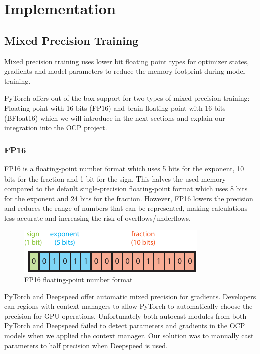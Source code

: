 \section{Implementation}

\subsection{Mixed Precision Training}

Mixed precision training uses lower bit floating point types for optimizer states, gradients and model parameters to 
reduce the memory footprint during model training. 

PyTorch offers out-of-the-box support for two types of mixed precision training: Floating point with 16 bits (FP16) and 
brain floating point with 16 bits (BFloat16) which we will introduce in the next sections and explain our integration 
into the OCP project.

\subsubsection{FP16}

FP16 is a floating-point number format which uses 5 bits for the exponent, 10 bits for the fraction and 1 bit for the 
sign. This halves the used memory compared to the default single-precision floating-point format which uses 8 bits 
for the exponent and 24 bits for the fraction. However, FP16 lowers the precision and reduces the range of numbers 
that can be represented, making calculations less accurate and increasing the risk of overflows/underflows.

\begin{figure}[h]
    \centering
    \includegraphics{figures/mixed_precision/float16.pdf}
    \caption{FP16 floating-point number format}
\end{figure}

PyTorch and Deepspeed offer automatic mixed precision for gradients. Developers can regions with context managers 
to allow PyTorch to automatically choose the precision for GPU operations. Unfortunately both autocast modules from 
both PyTorch and Deepspeed failed to detect parameters and gradients in the OCP models when we applied the context 
manager. Our solution was to manually cast parameters to half precision when Deepspeed is used. 

